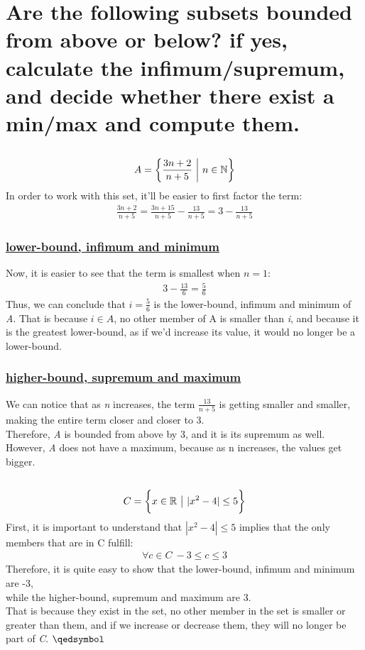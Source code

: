 \documentclass[a4paper, 12pt]{article}
\newcommand{\sub}[1]{\subsection{\underline{#1}}}
\newcommand{\subsub}[1]{\subsubsection{\underline{#1}}}
\newcommand{\R}{\ensuremath{\mathbb{R}}}
\newcommand{\N}{\ensuremath{\mathbb{N}}}
\newcommand{\eq}[1]{\begin{align*}#1\end{align*}}
\newcommand{\bigset}[1]{\bigg{\{} #1 \bigg{\}}}
\renewcommand{\qed}{\hfill\(\qedsymbol\)}
\begin{document}
\section{Are the following subsets bounded from above or below? if yes, calculate the infimum/supremum, and decide whether there exist a min/max and compute them.}
\sub{}
\eq{
    A=\bigg{\{}
        \frac{3n+2}{n+5}~\bigg{|}~n\in\N
    \bigg{\}}
}
In order to work with this set, it'll be easier to first factor the term:
\eq{
    \frac{3n+2}{n+5}=\frac{3n+15}{n+5}-\frac{13}{n+5}=3-\frac{13}{n+5}
}
\subsub{lower-bound, infimum and minimum}
Now, it is easier to see that the term is smallest when $n=1$:
\eq{
    3-\frac{13}{6}=\frac{5}{6}
}
Thus, we can conclude that $i=\frac{5}{6}$ is the lower-bound, infimum and minimum of \textit{A}.
That is because $i\in{A}$, no other member of A is smaller than \textit{i}, and because it is the greatest lower-bound,
as if we'd increase its value, it would no longer be a lower-bound.
\subsub{higher-bound, supremum and maximum}
We can notice that as \textit{n} increases, the term $\frac{13}{n+5}$ is getting smaller and smaller, making the entire term closer and closer to 3.\\
Therefore, \textit{A} is bounded from above by 3, and it is its supremum as well.\\
However, \textit{A} does not have a maximum, because as n increases, the values get bigger.
\setcounter{subsection}{2}
\sub{}
\eq{
    C=\bigset{
        x\in\R~\big{|}~|x^2-4|\leq{5}
    }        
}
First, it is important to understand that $|x^2-4|\leq{5}$ implies that the only members that are in C fulfill:
\eq{
    \forall{c}\in{C}~-3\leq{c}\leq{3}
}
Therefore, it is quite easy to show that the lower-bound, infimum and minimum are -3,\\
while the higher-bound, supremum and maximum are 3.\\
That is because they exist in the set, no other member in the set is smaller or greater than them, and if we increase or decrease them, they will no longer be part of \textit{C}.
\qed\pagebreak

\end{document}
